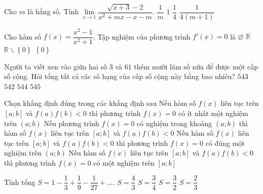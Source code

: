 \begin{ex}%
	Cho $m$ là hằng số. Tính $\lim\limits_{x\to 1}\dfrac{\sqrt{x+3}-2}{x^2+mx-x-m}$.
	\choice
	{$\dfrac{1}{m}$}
	{$1$}
	{$\dfrac{1}{4}$}
	{\True $\dfrac{1}{4(m+1)}$}
\end{ex}
\begin{ex}%
	Cho hàm số $f(x)=\dfrac{x^2-1}{x^2+1}$. Tập nghiệm của phương trình $f'(x)=0$ là
	\choice
	{$\varnothing$}
	{$\mathbb{R}$}
	{$\mathbb{R}\backslash\left\{0\right\}$}
	{\True $\left\{0\right\}$}
\end{ex}
\begin{ex}%
	Người ta viết xen vào giữa hai số $3$ và $61$ thêm mười lăm số nữa để được một cấp số cộng. Hỏi tổng tất cả các số hạng của cấp số cộng này bằng bao nhiêu?
	\choice
	{$543$}
	{$542$}
	{\True $544$}
	{$545$}
\end{ex}
\begin{ex}%
	Chọn khẳng định đúng trong các khẳng định sau
	\choice
	{\True Nếu hàm số $f(x)$ liên tục trên $[a;b]$ và $f(a)f(b)<0$ thì phương trình $f(x)=0$ có ít nhất một nghiệm trên $(a;b)$}
	{Nếu phương trình $f(x)=0$ có nghiệm trong khoảng $(a;b)$ thì hàm số $f(x)$ liên tục trên $[a;b]$ và $f(a)f(b)<0$}
	{Nếu hàm số $f(x)$ liên tục trên $[a;b]$ và $f(a)f(b)<0$ thì phương trình $f(x)=0$ có đúng một nghiệm trên $(a;b)$}
	{Nếu hàm số $f(x)$ liên tục trên $[a;b]$ và $f(a)f(b)<0$ thì phương trình $f(x)=0$ có một nghiệm trên $[a;b]$}
\end{ex}
\begin{ex}%
	Tính tổng $S=1-\dfrac{1}{3}+\dfrac{1}{9}-\dfrac{1}{27}+...$.
	\choice
	{$S=\dfrac{4}{3}$}
	{\True $S=\dfrac{3}{4}$}
	{$S=\dfrac{3}{2}$}
	{$S=\dfrac{2}{3}$}
\end{ex}
